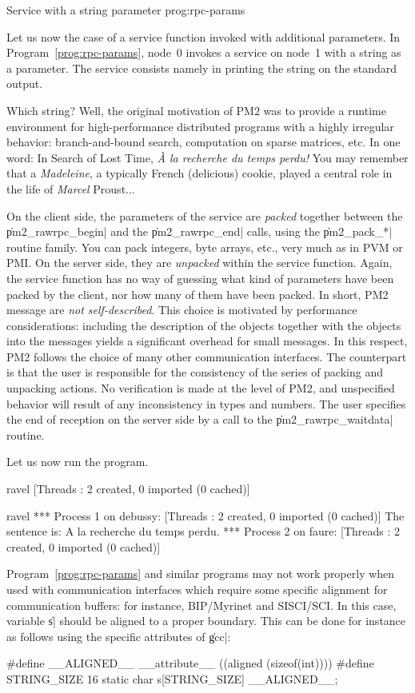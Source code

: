  {Service with a string
  parameter} {prog:rpc-params}

Let us now the case of a service function invoked with additional
parameters. In Program~\ref{prog:rpc-params}, node~0 invokes a service
on node~1 with a string as a parameter. The service consists namely in
printing the string on the standard output.
  
Which string? Well, the original motivation of PM2 was to provide a
runtime environment for high-performance distributed programs with a
highly irregular behavior: branch-and-bound search, computation on
sparse matrices, etc. In one word: In Search of Lost Time, \emph{\`A
  la recherche du temps perdu!} You may remember that a
\emph{Madeleine}, a typically French (delicious) cookie, played a
central role in the life of \emph{Marcel} Proust...
  
On the client side, the parameters of the service are \emph{packed}
together between the \|pm2_rawrpc_begin| and the \|pm2_rawrpc_end|
calls, using the \|pm2_pack_*| routine family. You can pack integers,
byte arrays, etc., very much as in PVM or PMI.  On the server side,
they are \emph{unpacked} within the service function.  Again, the
service function has no way of guessing what kind of parameters have
been packed by the client, nor how many of them have been packed. In
short, PM2 message are \emph{not self-described}.  This choice is
motivated by performance considerations: including the description of
the objects together with the objects into the messages yields a
significant overhead for small messages. In this respect, PM2 follows
the choice of many other communication interfaces. The counterpart is
that the user is responsible for the consistency of the series of
packing and unpacking actions. No verification is made at the level of
PM2, and unspecified behavior will result of any inconsistency in
types and numbers. The user specifies the end of reception on the
server side by a call to the \|pm2_rawrpc_waitdata| routine.

Let us now run the program.
\begin{shell}
ravel%
[Threads : 2 created, 0 imported (0 cached)]

ravel%
*** Process 1 on debussy:
[Threads : 2 created, 0 imported (0 cached)]
The sentence is: A la recherche du temps perdu.
*** Process 2 on faure:
[Threads : 2 created, 0 imported (0 cached)]
\end{shell}

\begin{warning}
  Program~\ref{prog:rpc-params} and similar programs may not work
  properly when used with communication interfaces which require some
  specific alignment for communication buffers: for instance,
  BIP/Myrinet and SISCI/SCI. In this case, variable \|s| should
  be aligned to a proper boundary. This can be done for instance as
  follows using the specific attributes of \|gcc|:
\begin{program}
#define __ALIGNED__ __attribute__ ((aligned (sizeof(int))))
#define STRING_SIZE  16
static char s[STRING_SIZE] __ALIGNED__;
\end{program}
\end{warning}

